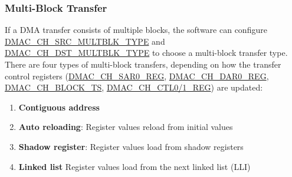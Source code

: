 \documentclass[main\_\_EN.tex]{subfiles}
\begin{document}
\subsubsection{Multi-Block Transfer}

If a DMA transfer consists of multiple blocks, the software can configure \hyperref[fielddesc:DMACCHNSRCMULTBLKTYPE]{DMAC\_CH\_SRC\_MULTBLK\_TYPE} and \hyperref[fielddesc:DMACCHNDSTMULTBLKTYPE]{DMAC\_CH\_DST\_MULTBLK\_TYPE} to choose a multi-block transfer type. There are four types of multi-block transfers, depending on how the transfer control registers (\hyperref[regdesc:DMACCHNSAR0REG]{DMAC\_CH\_SAR0\_REG}, \hyperref[regdesc:DMACCHNDAR0REG]{DMAC\_CH\_DAR0\_REG}, \hyperref[fielddesc:DMACCHNBLOCKTS]{DMAC\_CH\_BLOCK\_TS}, \hyperref[regdesc:DMACCHNCTL0REG]{DMAC\_CH\_CTL0/1\_REG}) are updated:

\begin{enumerate}
    \item \textbf{Contiguous address}
    \item \textbf{Auto reloading}: Register values reload from initial values
    \item \textbf{Shadow register}: Register values load from shadow registers
    \item \textbf{Linked list} Register values load from the next linked list (LLI)
\end{enumerate}
\end{document}
